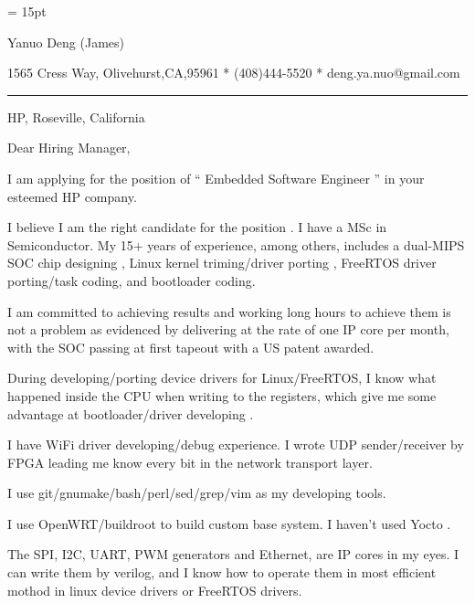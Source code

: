 

  \FFrg \baselineskip = 15pt

{
Yanuo Deng (James)
}

{ 
1565 Cress Way, Olivehurst,CA,95961
*
(408)444-5520
*
deng.ya.nuo@gmail.com
}

{ \smallbreak } 

{\par\noindent\hrule} 

{ \bigbreak } 



HP, Roseville, California

{ \bigbreak } 
{ 
Dear Hiring Manager,
}

{ \bigbreak } 
I am applying for the position of `` Embedded Software Engineer '' in your esteemed HP company.

{ \bigbreak } 
I believe I am the right candidate for the position .
I have a MSc in Semiconductor.
My 15+ years of experience, among others, 
includes a dual-MIPS SOC chip designing ,
Linux kernel triming/driver porting , 
FreeRTOS driver porting/task coding,
and bootloader coding.

{ \bigbreak } 
I am committed to achieving results and working long hours 
to achieve them is not a problem as evidenced by 
delivering at the rate of one IP core per month,
with the SOC passing at first tapeout
with a US patent awarded.

{ \bigbreak } 
During developing/porting device drivers for Linux/FreeRTOS,
I know what happened inside the CPU when writing to the registers,
which give me some advantage at bootloader/driver developing .

{ \bigbreak } 
I have WiFi driver developing/debug experience. 
I wrote UDP sender/receiver by FPGA leading me know every bit in the network transport layer.

{ \bigbreak } 
I use git/gnumake/bash/perl/sed/grep/vim as my developing tools.

{ \bigbreak } 
I use OpenWRT/buildroot to build custom base system. I haven't used Yocto .

{ \bigbreak } 
The SPI, I2C, UART, PWM generators and Ethernet, are IP cores in my eyes.
I can write them by verilog, 
and I know how to operate them in most efficient mothod
in linux device drivers or FreeRTOS drivers.

